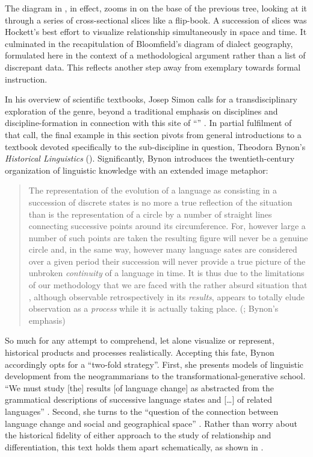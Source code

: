 \documentclass[output=paper]{langscibook}
\begin{document}
\largerpage[1]The diagram in , in effect, zooms in on the base of the previous tree, looking at it through a series of cross-sectional slices like a flip-book. A succession of slices was Hockett's best effort to visualize relationship simultaneously in space and time. It culminated in the recapitulation of Bloomfield's diagram of dialect geography, formulated here in the context of a methodological argument rather than a list of discrepant data. This reflects another step away from exemplary towards formal instruction.

In his overview of scientific textbooks, Josep Simon calls for a transdisciplinary exploration of the genre, beyond a traditional emphasis on disciplines and dis\-ci\-pline-formation in connection with this site of ``'' \citep[475]{Simon2016}. In partial fulfilment of that call, the final example in this section pivots from general introductions to a textbook devoted specifically to the sub-discipline in question, Theodora Bynon's \emph{Historical Linguistics} (\citeyear{Bynon1977}). Significantly, Bynon introduces the twentieth-century organization of linguistic knowledge with an extended image metaphor:

\begin{quotation}
The representation of the evolution of a language as consisting in a succession of discrete states is no more a true reflection of the situation than is the representation of a circle by a number of straight lines connecting successive points around its circumference. For, however large a number of such points are taken the resulting figure will never be a genuine circle and, in the same way, however many language sates are considered over a given period their succession will never provide a true picture of the unbroken \emph{continuity} of a language in time. It is thus due to the limitations of our methodology that we are faced with the rather absurd situation that , although observable retrospectively in its \emph{results}, appears to totally elude observation as a \emph{process} while it is actually taking place. (\citealt[2]{Bynon1977}; Bynon's emphasis)
\end{quotation}

So much for any attempt to comprehend, let alone visualize or represent, historical products and processes realistically. Accepting this fate, Bynon accordingly opts for a ``two-fold strategy''. First, she presents models of linguistic development from the neogrammarians to the transformational-generative school. ``We must study [the] results [of language change] as abstracted from the grammatical descriptions of successive language states and […] of related languages'' \citep[6]{Bynon1977}. Second, she turns to the ``question of the connection between language change and social and geographical space'' \citep[6]{Bynon1977}. Rather than worry about the historical fidelity of either approach to the study of relationship and differentiation, this text holds them apart schematically, as shown in .
\end{document}
